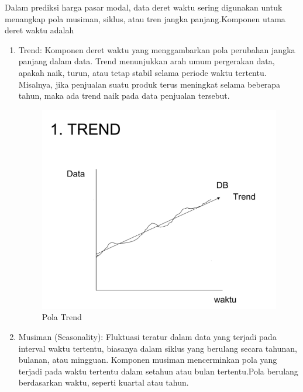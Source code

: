 Dalam prediksi harga pasar modal, data deret waktu sering digunakan untuk menangkap pola musiman, siklus, atau tren jangka panjang.Komponen utama deret waktu adalah
\begin{enumerate}
    \item Trend: Komponen deret waktu yang menggambarkan pola perubahan jangka panjang dalam data. Trend menunjukkan arah umum pergerakan data, apakah naik, turun, atau tetap stabil selama periode waktu tertentu. Misalnya, jika penjualan suatu produk terus meningkat selama beberapa tahun, maka ada trend naik pada data penjualan tersebut.
    \begin{figure} [H] \centering
    \includegraphics[scale=0.8]{gambar/deret waktu trend.png} 
    \caption{Pola Trend}
    \label{fig:label_gambar}
    \end{figure}
    \item Musiman (Seasonality): Fluktuasi teratur dalam data yang terjadi pada interval waktu tertentu, biasanya dalam siklus yang berulang secara tahunan, bulanan, atau mingguan. Komponen musiman mencerminkan pola yang terjadi pada waktu tertentu dalam setahun atau bulan tertentu.Pola berulang berdasarkan waktu, seperti kuartal atau tahun.
    \begin{figure} [H] \centering

\end{figure}
\end{enumerate}
